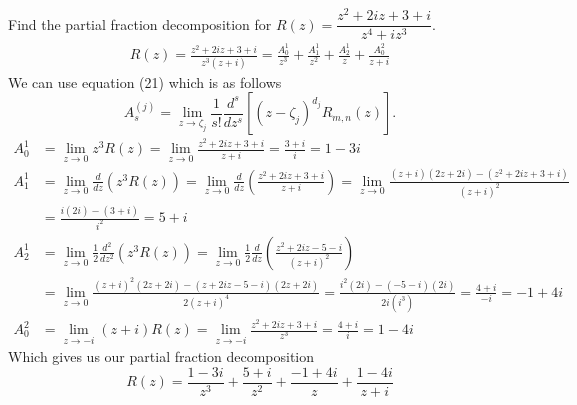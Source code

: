 \documentclass[12pt]{article}
\newenvironment{problem}[2][Problem]{\begin{trivlist}
\item[\hskip \labelsep {\bfseries #1} \hskip \labelsep {\bfseries #2.}]}{\end{trivlist}}
\begin{document}
\begin{problem}{1}
	Find the partial fraction decomposition for $R(z) = \dfrac{z^2 + 2iz + 3 + i}{z^4 + iz^3}$.	
	\begin{align*}
		R(z) = \frac{z^2 + 2iz + 3 + i}{z^3(z + i)} = \frac{A_0^1}{z^3} + \frac{A_1^1}{z^2} + \frac{A_2^1}{z} + \frac{A_0^2}{z+i}
	\end{align*}
	We can use equation (21) which is as follows
	\[
		A_s^{(j)} = \lim_{z \to \zeta_j} \frac{1}{s!} \frac{d^s}{dz^s}[(z - \zeta_j)^{d_j}R_{m,n}(z)].
	\]
	\begin{align*}
		A_0^1 &= \lim_{z \to 0} z^3 R(z) = \lim_{z\to 0} \frac{z^2 + 2iz + 3 + i}{z + i} = \frac{3 + i}{i} = 1 - 3i \\
		A_1^1 &= \lim_{z \to 0} \frac{d}{dz}(z^3 R(z)) = \lim_{z \to 0} \frac{d}{dz}\left(\frac{z^2 + 2iz + 3 + i}{z + i}\right) = \lim_{z \to 0} \frac{(z + i)(2z + 2i) - (z^2 + 2iz + 3 + i)}{(z + i)^2} \\
		      &= \frac{i(2i) - (3 + i)}{i^2} = 5 + i \\
		A_2^1 &= \lim_{z \to 0} \frac{1}{2} \frac{d^2}{dz^2}(z^3 R(z)) = \lim_{z \to 0} \frac{1}{2} \frac{d}{dz} \left(\frac{z^2 + 2iz - 5 - i}{(z+i)^2}\right) \\
		      &= \lim_{z \to 0} \frac{(z+i)^2(2z + 2i) - (z + 2iz - 5 - i)(2z + 2i)}{2(z + i)^4} = \frac{i^2(2i) - (-5 -i)(2i)}{2i(i^3)} = \frac{4 + i}{-i} = -1 + 4i \\
		A_0^2 &= \lim_{z \to -i} (z + i)R(z) = \lim_{z \to -i} \frac{z^2 + 2iz + 3 + i}{z^3} = \frac{4 + i}{i} = 1 - 4i
	\end{align*}
	Which gives us our partial fraction decomposition
	\[
		R(z) = \frac{1-3i}{z^3} + \frac{5+i}{z^2} + \frac{-1+4i}{z} + \frac{1 - 4i}{z + i}
	\]
\end{problem}
\end{document}
